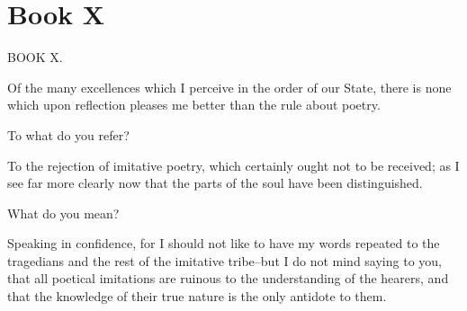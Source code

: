 









\section{Book X} %
\label{sec:book_x}



BOOK X.

Of the many excellences which I perceive in the order of our State,
there is none which upon reflection pleases me better than the rule
about poetry.

To what do you refer?

To the rejection of imitative poetry, which certainly ought not to be
received; as I see far more clearly now that the parts of the soul have
been distinguished.

What do you mean?

Speaking in confidence, for I should not like to have my words repeated
to the tragedians and the rest of the imitative tribe--but I do not
mind saying to you, that all poetical imitations are ruinous to the
understanding of the hearers, and that the knowledge of their true
nature is the only antidote to them.

